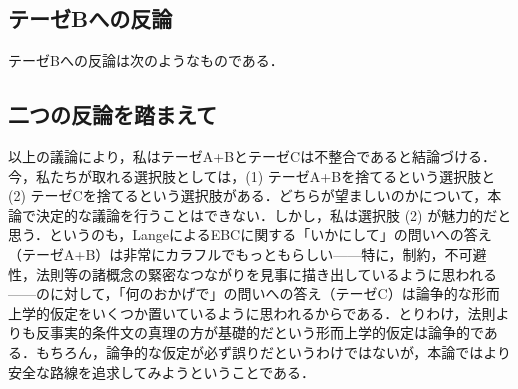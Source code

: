 \documentclass[dvipdfmx,twoside,11pt,uplatex]{jsarticle}
\theoremstyle{definition}
\begin{document}



\subsection{テーゼBへの反論}\label{objectiontob}
テーゼBへの反論は次のようなものである．

\subsection{二つの反論を踏まえて}
以上の議論により，私はテーゼA+BとテーゼCは不整合であると結論づける．今，私たちが取れる選択肢としては，(1) テーゼA+Bを捨てるという選択肢と (2) テーゼCを捨てるという選択肢がある．どちらが望ましいのかについて，本論で決定的な議論を行うことはできない．しかし，私は選択肢 (2) が魅力的だと思う．というのも，LangeによるEBCに関する「いかにして」の問いへの答え（テーゼA+B）は非常にカラフルでもっともらしい------特に，制約，不可避性，法則等の諸概念の緊密なつながりを見事に描き出しているように思われる------のに対して，「何のおかげで」の問いへの答え（テーゼC）は論争的な形而上学的仮定をいくつか置いているように思われるからである．とりわけ，法則よりも反事実的条件文の真理の方が基礎的だという形而上学的仮定は論争的である\citep{Demarest2012counter,woodwardetal2011lange}．もちろん，論争的な仮定が必ず誤りだというわけではないが，本論ではより安全な路線を追求してみようということである．
\end{document}
